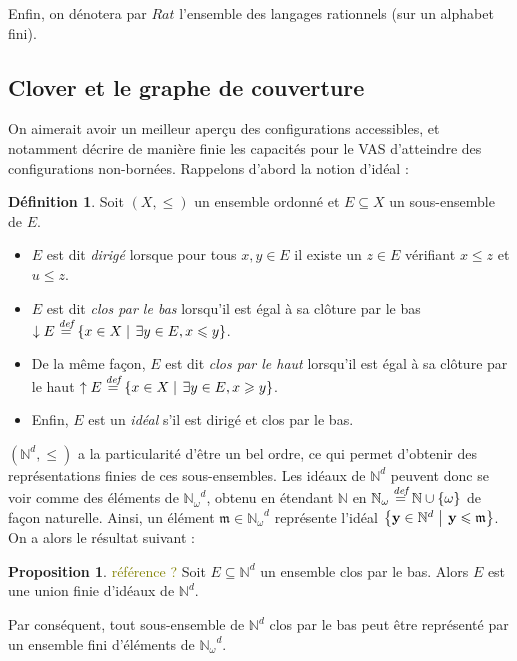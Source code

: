 \documentclass[a4paper,final]{article}
\theoremstyle{definition}
\newtheorem{Definition}[Theorem]{Définition}
\newtheorem{Proposition}[Theorem]{Proposition}
\let\leq\leqslant
\let\geq\geqslant
\newcommand{\lucas}[1]{\textcolor{olive}{#1}}
\newcommand{\set}[2]{\left\{#1\mathrel{\left|\vphantom{#1}\vphantom{#2}\right.}#2\right\}}
\newcommand{\os}[1]{\left\{\mathinner{#1}\right\}}
\newcommand{\defeq}{\ensuremath{\stackrel{\textit{def}}{=}}}
\let\union\cup
\newcommand{\N}{\ensuremath{\mathbb{N}}}
\newcommand{\Nomega}{\ensuremath{\mathbb{N}_\omega}}
\newcommand{\vect}[1]{\ensuremath{\mathbf{#1}}}
\begin{document}
Enfin, on dénotera par $Rat$ l'ensemble des langages rationnels (sur un alphabet fini).

\subsection{Clover et le graphe de couverture}

On aimerait avoir un meilleur aperçu des configurations accessibles, et notamment décrire de manière finie les capacités pour le VAS d'atteindre des configurations non-bornées.
Rappelons d'abord la notion d'idéal :

\begin{Definition}
Soit $(X,\leq)$ un ensemble ordonné et $E\subseteq X$ un sous-ensemble de $E$.
\begin{itemize}
    \item $E$ est dit \emph{dirigé} lorsque pour tous $x,y\in E$ il existe un $z\in E$ vérifiant $x\leq z$ et $u\leq z$.
    \item $E$ est dit \emph{clos par le bas} lorsqu'il est égal à sa clôture par le bas $\downarrow E \defeq \set{x\in X}{\exists y\in E, x\leq y}$.
    \item De la même façon, $E$ est dit \emph{clos par le haut} lorsqu'il est égal à sa clôture par le haut $\uparrow E \defeq \set{x\in X}{\exists y\in E, x \geq y}$.
    \item Enfin, $E$ est un \emph{idéal} s'il est dirigé et clos par le bas.
\end{itemize}
\end{Definition}

$(\N^d,\leq)$ a la particularité d'être un bel ordre, ce qui permet d'obtenir des représentations finies de ces sous-ensembles.
Les idéaux de $\N^d$ peuvent donc se voir comme des éléments de $\Nomega^d$, obtenu en étendant $\N$ en $\Nomega\defeq \N\union\os{\omega}$ de façon naturelle. %
Ainsi, un élément $\mathfrak{m}\in \Nomega^d$ représente l'idéal $\set{\vect{y}\in\N^d}{\vect{y} \leq \mathfrak{m}}$.
On a alors le résultat suivant :

\begin{Proposition}
\lucas{référence ?}
Soit $E \subseteq \N^d$ un ensemble clos par le bas.
Alors $E$ est une union finie d'idéaux de $\N^d$.
\end{Proposition}

Par conséquent, tout sous-ensemble de $\N^d$ clos par le bas peut être représenté par un ensemble fini d'éléments de $\Nomega^d$.
\end{document}
